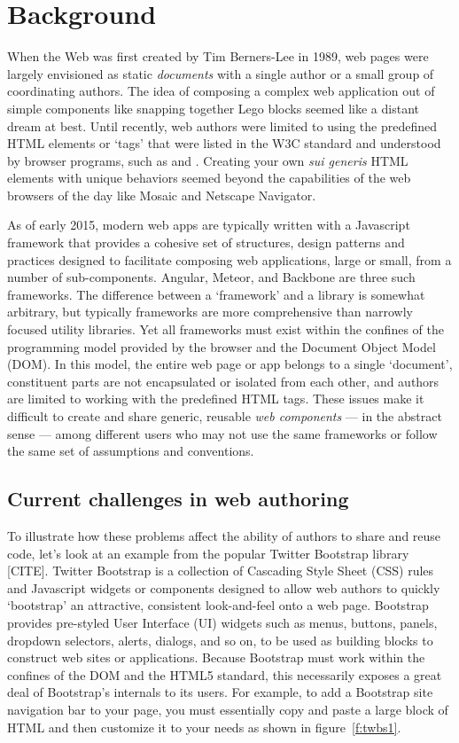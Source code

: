 \chapter{Background}
%

When the Web was first created by Tim Berners-Lee in 1989, web pages were largely envisioned as static \textit{documents} with a single author or a small group of coordinating authors. 
The idea of composing a complex web application out of simple components like snapping together Lego blocks seemed like a distant dream at best.
Until recently, web authors were limited to using the predefined HTML elements or `tags' that were listed in the W3C standard and understood by browser programs, such as  and . 
Creating your own \textit{sui generis} HTML elements with unique behaviors seemed beyond the capabilities of the web browsers of the day like Mosaic and Netscape Navigator.

As of early 2015, modern web apps are typically written with a Javascript framework that provides a cohesive set of structures, design patterns and practices designed to facilitate composing web applications, large or small, from a number of sub-components.
Angular, Meteor, and Backbone are three such frameworks.
The difference between a `framework' and a library is somewhat arbitrary, but typically frameworks are more comprehensive than narrowly focused utility libraries.
Yet all frameworks must exist within the confines of the programming model provided by the browser and the Document Object Model (DOM). 
In this model, the entire web page or app belongs to a single `document', constituent parts are not encapsulated or isolated from each other, and authors are limited to working with the predefined HTML tags.
These issues make it difficult to create and share generic, reusable \textit{web components} 
--- in the abstract sense --- 
among different users who may not use the same frameworks or follow the same set of assumptions and conventions.

\section{Current challenges in web authoring}
To illustrate how these problems affect the ability of authors to share and reuse code, let's look at an example from the popular Twitter Bootstrap library [CITE].
Twitter Bootstrap is a collection of Cascading Style Sheet (CSS) rules and Javascript widgets or components designed to allow web authors to quickly `bootstrap' an attractive, consistent look-and-feel onto a web page.
Bootstrap provides pre-styled User Interface (UI) widgets such as menus, buttons, panels, dropdown selectors, alerts, dialogs, and so on, to be used as building blocks to construct web sites or applications.
Because Bootstrap must work within the confines of the DOM and the HTML5 standard, this necessarily exposes a great deal of Bootstrap's internals to its users.
For example, to add a Bootstrap site navigation bar to your page, you must essentially copy and paste a large block of HTML and then customize it to your needs as shown in figure~\ref{f:twbs1}.

